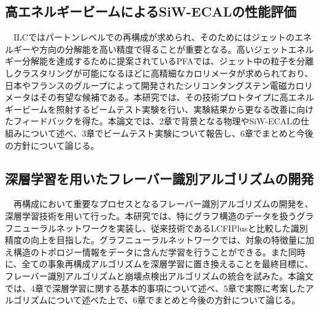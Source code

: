 \subsection{高エネルギービームによるSiW-ECALの性能評価}
　ILCではパートンレベルでの再構成が求められ、そのためにはジェットのエネルギーや方向の分解能を高い精度で得ることが重要となる。高いジェットエネルギー分解能を達成するために提案されているPFAでは、ジェット中の粒子を分離しクラスタリングが可能になるほどに高精細なカロリメータが求められており、日本やフランスのグループによって開発されたシリコンタングステン電磁カロリメータはその有望な候補である。本研究では、その技術プロトタイプに高エネルギービームを照射するビームテスト実験を行い、実験結果から更なる改善に向けたフィードバックを得た。本論文では、2章で背景となる物理やSiW-ECALの仕組みについて述べ、3章でビームテスト実験について報告し、6章でまとめと今後の方針について論じる。\\
\subsection{深層学習を用いたフレーバー識別アルゴリズムの開発}
　再構成において重要なプロセスとなるフレーバー識別アルゴリズムの開発を、深層学習技術を用いて行った。本研究では、特にグラフ構造のデータを扱うグラフニューラルネットワークを実装し、従来技術であるLCFIPlusと比較した識別精度の向上を目指した。グラフニューラルネットワークでは、対象の特徴量に加え構造のトポロジー情報をデータに含んだ学習を行うことができる。また同時に、全ての事象再構成アルゴリズムを深層学習に置き換えることを最終目標に、フレーバー識別アルゴリズムと崩壊点検出アルゴリズムの統合を試みた。本論文では、4章で深層学習に関する基本的事項について述べ、5章で実際に考案したアルゴリズムについて述べた上で、6章でまとめと今後の方針について論じる。
